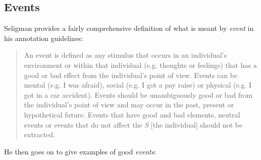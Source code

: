 \documentclass[a4paper,12pt]{article}
\begin{document}
\subsection{Events}
\begin{comment}
Seligman defines events as ``any stimulus that occurs in an individual’s environment or
within that individual (e.g. thoughts or feelings) that has a good or bad effect from the individual’s point of
view.'' He further elaborates that events may be mental, social, or physical. An example of a mental event is
“I was afraid.” An example of a social event is “I got a pay raise.” An example of a physical event is “I got in a
car accident.” Though all of these examples are stated in the simple past, events may occur in the past (“I
was afraid”), present (“I am afraid”), or hypothetical future (“I may become afraid”).
A critical element of defining events is their polarity. Events must be \emph{unambiguously positive or negative
in terms of its effects from the perspective of the speaker.} If the speaker has conflicted feelings about
the event, it should not be annotated. If the speaker feels that the event is neutral (neither positive or
negative) then it should not be annotated. If the event does not impact the speaker, it should not be
annotated. Remember that what is important is how the speaker perceives the event. As an annotator, you
may think that an event is positive, but the client could feel negatively or conflicted about it (e.g. quitting
smoking).
\end{comment}

Seligman provides a fairly comprehensive definition of what is meant by \emph{event} in his annotation guidelines: %

\begin{quote}
    An event is defined as any stimulus that occurs in an individual's environment or within that individual (e.g. thoughts or feelings) that has a good or bad effect from the individual's point of view.
    Events can be mental (e.g. I was afraid), social (e.g. I got a pay raise) or physical (e.g. I got in a car accident).
    Events should be unambiguously good or bad from the individual's point of view and may occur in the past, present or hypothetical future.
    Events that have good and bad elements, neutral events or events that do not affect the \emph{S} [the individual] should not be extracted.
\end{quote}

He then goes on to give examples of good \emph{events}: %
\begin{quote}
\end{quote}
\end{document}
